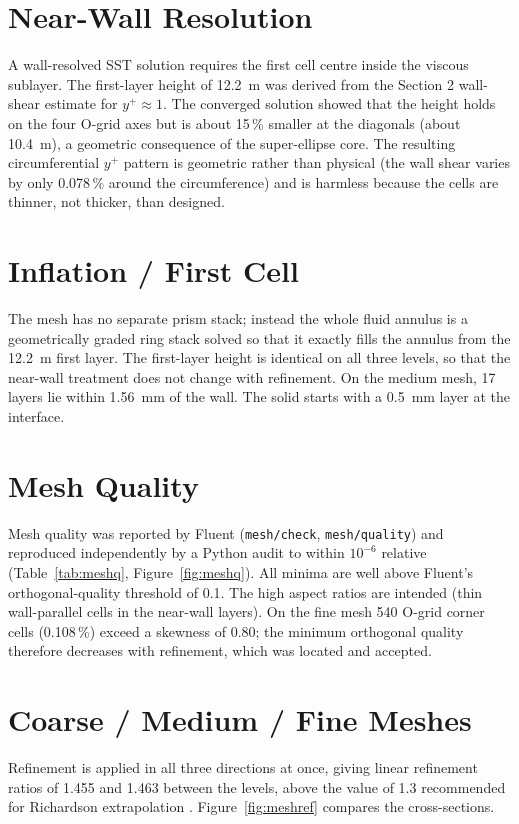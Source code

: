 \section{Near-Wall Resolution}
A wall-resolved SST solution requires the first cell centre inside the viscous sublayer. The first-layer height of 12.2~\textmu m was derived
from the Section 2 wall-shear estimate for $y^+ \approx 1$. The converged solution showed that the height holds on the four O-grid axes but
is about 15\,\% smaller at the diagonals (about 10.4~\textmu m), a geometric consequence of the super-ellipse core. The resulting
circumferential $y^+$ pattern is geometric rather than physical (the wall shear varies by only 0.078\,\% around the circumference) and is
harmless because the cells are thinner, not thicker, than designed.

\section{Inflation / First Cell}
The mesh has no separate prism stack; instead the whole fluid annulus is a geometrically graded ring stack solved so that it exactly fills
the annulus from the 12.2~\textmu m first layer. The first-layer height is identical on all three levels, so that the near-wall treatment does
not change with refinement. On the medium mesh, 17 layers lie within 1.56~mm of the wall. The solid starts with a 0.5~mm layer at the interface.

\section{Mesh Quality}
Mesh quality was reported by Fluent (\texttt{mesh/check}, \texttt{mesh/quality}) and reproduced independently by a Python audit to within
$10^{-6}$ relative (Table~\ref{tab:meshq}, Figure~\ref{fig:meshq}). All minima are well above Fluent's orthogonal-quality threshold of 0.1.
The high aspect ratios are intended (thin wall-parallel cells in the near-wall layers). On the fine mesh 540 O-grid corner cells (0.108\,\%)
exceed a skewness of 0.80; the minimum orthogonal quality therefore decreases with refinement, which was located and accepted.



\section{Coarse / Medium / Fine Meshes}
Refinement is applied in all three directions at once, giving linear refinement ratios of 1.455 and 1.463 between the levels, above the value
of 1.3 recommended for Richardson extrapolation \cite{celik2008}. Figure~\ref{fig:meshref} compares the cross-sections.

